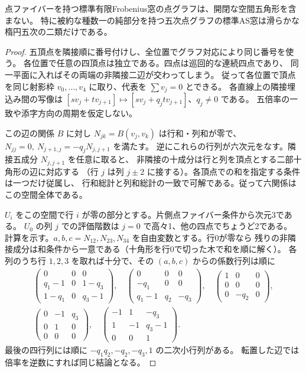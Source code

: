 \begin{theorem}\label{thm:pentagon-node-rank}
点ファイバーを持つ標準有限Frobenius窓の点グラフは、開閉な空間五角形を含まない。
特に被約な種数一の純部分を持つ五次点グラフの標準AS窓は滑らかな楕円五次の二類だけである。
\end{theorem}
\begin{proof}
五頂点を隣接順に番号付けし、全位置でグラフ対応により同じ番号を使う。
各位置で任意の四頂点は独立である。四点は巡回的な連続四点であり、
同一平面に入ればその両端の非隣接二辺が交わってしまう。
従って各位置で頂点を同じ射影枠 $v_0,\ldots,v_4$ に取り、代表を $\sum v_j=0$ とできる。
各直線上の隣接埋込み間の写像は
$[s v_j+t v_{j+1}]\mapsto[s v_j+q_j t v_{j+1}]$、$q_j\ne0$ である。
五倍率の一致や添字方向の周期を仮定しない。

この辺の関係 $B$ に対し $N_{jk}=B(v_j,v_k)$ は行和・列和が零で、
$N_{jj}=0,\ N_{j+1,j}=-q_j N_{j,j+1}$ を満たす。
逆にこれらの行列が六次元をなす。隣接五成分 $N_{j,j+1}$ を任意に取ると、
非隣接の十成分は行と列を頂点とする二部十角形の辺に対応する
（行 $j$ は列 $j\pm2$ に接する）。各頂点での和を指定する条件は一つだけ従属し、
行和総計と列和総計の一致で可解である。従って六関係はこの空間全体である。

$U_i$ をこの空間で行 $i$ が零の部分とする。片側点ファイバー条件から次元3である。
$U_0$ の列 $j$ での評価階数は $j=0$ で高々1、他の四点でちょうど2である。
計算を示す。$a,b,c=N_{12},N_{23},N_{34}$ を自由変数とする。行0が零なら
残りの非隣接成分は和条件から一意である（十角形を行0で切った木で和を順に解く）。
各列のうち行 $1,2,3$ を取れば十分で、その $(a,b,c)$ からの係数行列は順に
\[
\begin{gathered}
\begin{pmatrix}0&0&0\\q_1-1&0&1-q_3\\1-q_1&0&q_3-1\end{pmatrix},\quad
\begin{pmatrix}0&0&0\\-q_1&0&0\\q_1-1&q_2&-q_3\end{pmatrix},\quad
\begin{pmatrix}1&0&0\\0&0&0\\0&-q_2&0\end{pmatrix},\\
\begin{pmatrix}0&-1&q_3\\0&1&0\\0&0&0\end{pmatrix},\quad
\begin{pmatrix}-1&1&-q_3\\1&-1&q_3-1\\0&0&1\end{pmatrix}.
\end{gathered}
\]
最後の四行列には順に $-q_1q_2,-q_2,-q_3,1$ の二次小行列がある。
転置した辺では倍率を逆数にすれば同じ結論となる。


\end{proof}
